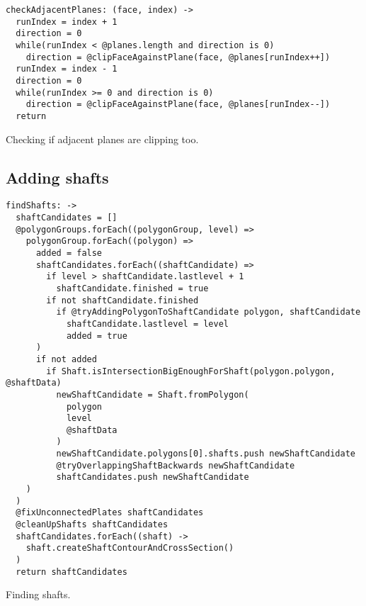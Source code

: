 \documentclass[../ClassicThesis.tex]{subfiles}
\begin{document}
\begin{listing}[ht]
\begin{verbatim}
checkAdjacentPlanes: (face, index) ->
  runIndex = index + 1
  direction = 0
  while(runIndex < @planes.length and direction is 0)
    direction = @clipFaceAgainstPlane(face, @planes[runIndex++])
  runIndex = index - 1
  direction = 0
  while(runIndex >= 0 and direction is 0)
    direction = @clipFaceAgainstPlane(face, @planes[runIndex--])
  return
\end{verbatim}
\caption{Checking if adjacent planes are clipping too.}
\label{lst:checkadjacent}
\end{listing}

\subsection{Adding shafts}

\begin{listing}[ht]
\begin{verbatim}
findShafts: ->
  shaftCandidates = []
  @polygonGroups.forEach((polygonGroup, level) =>
    polygonGroup.forEach((polygon) =>
      added = false
      shaftCandidates.forEach((shaftCandidate) =>
        if level > shaftCandidate.lastlevel + 1
          shaftCandidate.finished = true
        if not shaftCandidate.finished
          if @tryAddingPolygonToShaftCandidate polygon, shaftCandidate
            shaftCandidate.lastlevel = level
            added = true
      )
      if not added
        if Shaft.isIntersectionBigEnoughForShaft(polygon.polygon, @shaftData)
          newShaftCandidate = Shaft.fromPolygon(
            polygon
            level
            @shaftData
          )
          newShaftCandidate.polygons[0].shafts.push newShaftCandidate
          @tryOverlappingShaftBackwards newShaftCandidate
          shaftCandidates.push newShaftCandidate
    )
  )
  @fixUnconnectedPlates shaftCandidates
  @cleanUpShafts shaftCandidates
  shaftCandidates.forEach((shaft) ->
    shaft.createShaftContourAndCrossSection()
  )
  return shaftCandidates
\end{verbatim}
\caption{Finding shafts.}
\label{lst:findshafts}
\end{listing}
\end{document}
